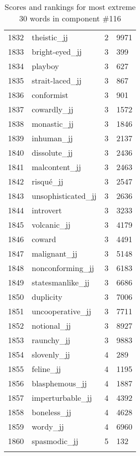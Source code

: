 \begin{longtable}[!htbp]{| rlr@{.}l |}
    1832 & theistic\_jj & 2 & 9971 \\
    1833 & bright-eyed\_jj & 3 & 399 \\
    1834 & playboy & 3 & 627 \\
    1835 & strait-laced\_jj & 3 & 867 \\
    1836 & conformist & 3 & 901 \\
    1837 & cowardly\_jj & 3 & 1572 \\
    1838 & monastic\_jj & 3 & 1846 \\
    1839 & inhuman\_jj & 3 & 2137 \\
    1840 & dissolute\_jj & 3 & 2436 \\
    1841 & malcontent\_jj & 3 & 2463 \\
    1842 & risqué\_jj & 3 & 2547 \\
    1843 & unsophisticated\_jj & 3 & 2636 \\
    1844 & introvert & 3 & 3233 \\
    1845 & volcanic\_jj & 3 & 4179 \\
    1846 & coward & 3 & 4491 \\
    1847 & malignant\_jj & 3 & 5148 \\
    1848 & nonconforming\_jj & 3 & 6183 \\
    1849 & statesmanlike\_jj & 3 & 6686 \\
    1850 & duplicity & 3 & 7006 \\
    1851 & uncooperative\_jj & 3 & 7711 \\
    1852 & notional\_jj & 3 & 8927 \\
    1853 & raunchy\_jj & 3 & 9883 \\
    1854 & slovenly\_jj & 4 & 289 \\
    1855 & feline\_jj & 4 & 1195 \\
    1856 & blasphemous\_jj & 4 & 1887 \\
    1857 & imperturbable\_jj & 4 & 4392 \\
    1858 & boneless\_jj & 4 & 4628 \\
    1859 & wordy\_jj & 4 & 6960 \\
    1860 & spasmodic\_jj & 5 & 132 \\
    \hline
    \caption{Scores and rankings for most extreme 30 words in component \#116} \\
\end{longtable}
